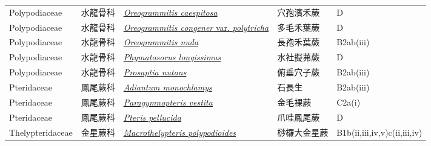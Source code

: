 {\begin{longtable}{L{2.5cm}L{2cm}L{5cm}L{2.5cm}L{3cm}}
    Polypodiaceae & 水龍骨科 & \href{http://www.theplantlist.org/tpl1.1/search?q=Oreogrammitis+caespitosa}{\textit{Oreogrammitis caespitosa} } & 穴孢濱禾蕨 & D    \\
    Polypodiaceae & 水龍骨科 & \href{http://www.theplantlist.org/tpl1.1/search?q=Oreogrammitis+congener+var.+polytricha}{\textit{Oreogrammitis congener} var. \textit{polytricha} } & 多毛禾葉蕨 & D    \\
    Polypodiaceae & 水龍骨科 & \href{http://www.theplantlist.org/tpl1.1/search?q=Oreogrammitis+nuda}{\textit{Oreogrammitis nuda} } & 長孢禾葉蕨 & B2ab(iii)    \\
    Polypodiaceae & 水龍骨科 & \href{http://www.theplantlist.org/tpl1.1/search?q=Phymatosorus+longissimus}{\textit{Phymatosorus longissimus} } & 水社擬茀蕨 & D    \\
    Polypodiaceae & 水龍骨科 & \href{http://www.theplantlist.org/tpl1.1/search?q=Prosaptia+nutans}{\textit{Prosaptia nutans} } & 俯垂穴子蕨 & B2ab(iii)    \\
    Pteridaceae & 鳳尾蕨科 & \href{http://www.theplantlist.org/tpl1.1/search?q=Adiantum+monochlamys}{\textit{Adiantum monochlamys} } & 石長生 & B2ab(iii)    \\
    Pteridaceae & 鳳尾蕨科 & \href{http://www.theplantlist.org/tpl1.1/search?q=Paragymnopteris+vestita}{\textit{Paragymnopteris vestita} } & 金毛裸蕨 & C2a(i)    \\
    Pteridaceae & 鳳尾蕨科 & \href{http://www.theplantlist.org/tpl1.1/search?q=Pteris+pellucida}{\textit{Pteris pellucida} } & 爪哇鳳尾蕨 & D    \\
    Thelypteridaceae & 金星蕨科 & \href{http://www.theplantlist.org/tpl1.1/search?q=Macrothelypteris+polypodioides}{\textit{Macrothelypteris polypodioides} } & 桫欏大金星蕨 & B1b(ii,iii,iv,v)c(ii,iii,iv)    \\

\end{longtable}}

